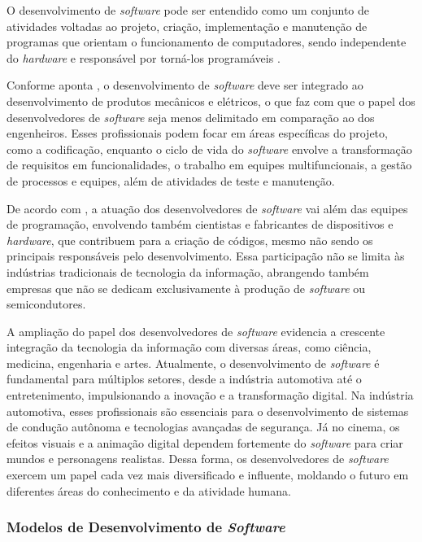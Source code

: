 \documentclass[english,brazilian]{UNISINOSartigo} %
\begin{document}
O desenvolvimento de \textit{software} pode ser entendido como um conjunto de atividades voltadas ao projeto, criação, implementação e manutenção de programas que orientam o funcionamento de computadores, sendo independente do \textit{hardware} e responsável por torná-los programáveis \cite{schwab2019}.

Conforme aponta , o desenvolvimento de \textit{software} deve ser integrado ao desenvolvimento de produtos mecânicos e elétricos, o que faz com que o papel dos desenvolvedores de \textit{software} seja menos delimitado em comparação ao dos engenheiros. Esses profissionais podem focar em áreas específicas do projeto, como a codificação, enquanto o ciclo de vida do \textit{software} envolve a transformação de requisitos em funcionalidades, o trabalho em equipes multifuncionais, a gestão de processos e equipes, além de atividades de teste e manutenção.

De acordo com , a atuação dos desenvolvedores de \textit{software} vai além das equipes de programação, envolvendo também cientistas e fabricantes de dispositivos e \textit{hardware}, que contribuem para a criação de códigos, mesmo não sendo os principais responsáveis pelo desenvolvimento. Essa participação não se limita às indústrias tradicionais de tecnologia da informação, abrangendo também empresas que não se dedicam exclusivamente à produção de \textit{software} ou semicondutores.

A ampliação do papel dos desenvolvedores de \textit{software} evidencia a crescente integração da tecnologia da informação com diversas áreas, como ciência, medicina, engenharia e artes. Atualmente, o desenvolvimento de \textit{software} é fundamental para múltiplos setores, desde a indústria automotiva até o entretenimento, impulsionando a inovação e a transformação digital. Na indústria automotiva, esses profissionais são essenciais para o desenvolvimento de sistemas de condução autônoma e tecnologias avançadas de segurança. Já no cinema, os efeitos visuais e a animação digital dependem fortemente do \textit{software} para criar mundos e personagens realistas. Dessa forma, os desenvolvedores de \textit{software} exercem um papel cada vez mais diversificado e influente, moldando o futuro em diferentes áreas do conhecimento e da atividade humana.

\subsubsection{Modelos de Desenvolvimento de \textit{Software}}
\end{document}
